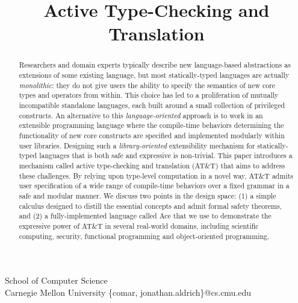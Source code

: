 \documentclass[10pt]{sigplanconf}
\begin{document}


\title{Active Type-Checking and Translation}

       {School of Computer Science\\
        Carnegie Mellon University}
        {\{comar, jonathan.aldrich\}@cs.cmu.edu}   

\maketitle
\begin{abstract}

Researchers and domain experts typically describe new language-based abstractions as extensions of some existing language, but most statically-typed languages are actually \emph{monolithic}: they do not give users the ability to specify the semantics of new core types and operators from within. This choice has led to a proliferation of mutually incompatible standalone languages, each built around a small collection of privileged constructs. 
An alternative to this \emph{language-oriented} approach is to work in an extensible programming language where the compile-time behaviors determining the functionality of new core constructs are specified and implemented modularly within user libraries. Designing such a \emph{library-oriented} extensibility mechanism for statically-typed languages that is both safe and expressive is non-trivial. %
This paper introduces a mechanism called active type-checking and translation (AT\&T) that aims to address these  challenges. By relying upon type-level computation in a novel way, AT\&T admits user specification of a wide range of compile-time behaviors over a fixed grammar in a safe and modular manner. We discuss two points in the design space: (1) a simple calculus designed to distill the essential concepts and admit formal safety theorems, and (2) a fully-implemented language called Ace that we use to demonstrate the expressive power of AT\&T in several real-world domains, including scientific computing, security, functional programming and object-oriented programming.
\end{abstract}
\end{document}
